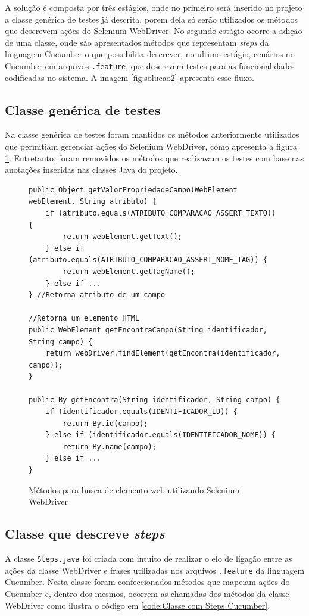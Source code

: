 \documentclass[tg]{mdtufsm}
\begin{document}
A solução é composta por três estágios, onde no primeiro será inserido no projeto a classe genérica de testes já descrita, porem dela só serão utilizados os métodos que descrevem ações do Selenium WebDriver. No segundo estágio ocorre a adição de uma classe, onde são apresentados métodos que representam \emph{steps} da linguagem Cucumber o que possibilita descrever, no ultimo estágio, cenários no Cucumber em arquivos \texttt{.feature}, que descrevem testes para as funcionalidades codificadas no sistema. A imagem \ref{fig:solucao2} apresenta esse fluxo.

\subsection{Classe genérica de testes}
Na classe genérica de testes foram mantidos os métodos anteriormente utilizados que permitiam gerenciar ações do Selenium WebDriver, como apresenta a figura \ref{code:Classe genérica contendo métodos WebDriver}.
Entretanto, foram removidos os métodos que realizavam os testes com base nas anotações inseridas nas classes Java do projeto.

\begin{figure}[!htt]
	\begin{lstlisting}
public Object getValorPropriedadeCampo(WebElement webElement, String atributo) {
    if (atributo.equals(ATRIBUTO_COMPARACAO_ASSERT_TEXTO)) {
        return webElement.getText();
    } else if (atributo.equals(ATRIBUTO_COMPARACAO_ASSERT_NOME_TAG)) {
        return webElement.getTagName();
    } else if ...
} //Retorna atributo de um campo

//Retorna um elemento HTML
public WebElement getEncontraCampo(String identificador, String campo) { 
    return webDriver.findElement(getEncontra(identificador, campo));
}

public By getEncontra(String identificador, String campo) {
    if (identificador.equals(IDENTIFICADOR_ID)) {
        return By.id(campo);
    } else if (identificador.equals(IDENTIFICADOR_NOME)) {
        return By.name(campo);
    } else if ...
}
	\end{lstlisting}
	\caption{Métodos para busca de elemento web utilizando Selenium WebDriver}
	\label{code:Classe genérica contendo métodos WebDriver}
\end{figure}

\subsection{Classe que descreve \emph{steps}}
A classe \texttt{Steps.java} foi criada com intuito de realizar o elo de ligação entre as ações da classe WebDriver e frases utilizadas nos arquivos \texttt{.feature} da linguagem Cucumber. Nesta classe foram confeccionados métodos que mapeiam ações do Cucumber e, dentro dos mesmos, ocorrem as chamadas dos métodos da classe WebDriver como ilustra o código em \ref{code:Classe com Steps Cucumber}.
\end{document}
